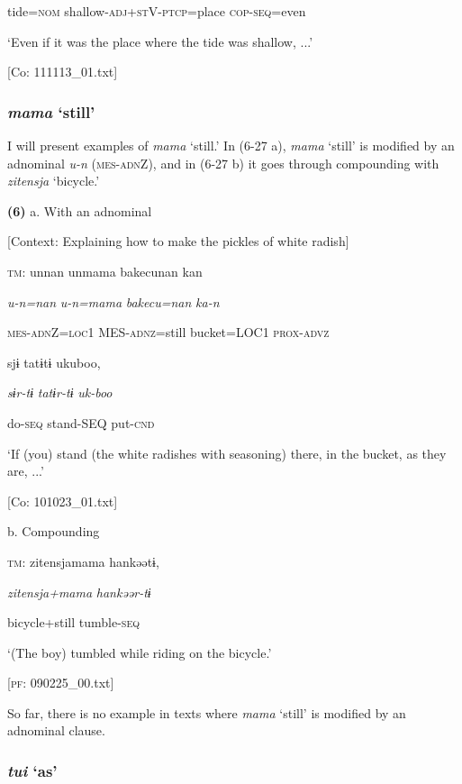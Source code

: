       tide=\textsc{nom}  shallow-\textsc{adj}+\textsc{st}V-\textsc{ptcp}=place  \textsc{cop}-\textsc{seq}=even

      ‘Even if it was the place where the tide was shallow, ...’

      [Co: 111113\_01.txt]

\subsubsection{ \textit{mama} ‘still’}

I will present examples of \textit{mama} ‘still.’ In (6-27 a), \textit{mama} ‘still’ is modified by an adnominal \textit{u-n} (\textsc{mes}-\textsc{adn}Z), and in (6-27 b) it goes through compounding with \textit{zitensja} ‘bicycle.’

\textbf{(6)}  a.  With an adnominal

    [Context: Explaining how to make the pickles of white radish]

    \textsc{tm}:  unnan  unmama  {\textbar}bakecu{\textbar}nan  kan

      \textit{u-n=nan}  \textit{u-n=mama}  \textit{bakecu=nan}  \textit{ka-n}

      \textsc{mes}-\textsc{adn}Z=\textsc{loc}1  MES-\textsc{adnz}=still  bucket=LOC1  \textsc{prox}-\textsc{advz}

      sjɨ  tatɨtɨ  ukuboo,

      \textit{sɨr-tɨ}  \textit{tatɨr-tɨ}  \textit{uk-boo}

      do-\textsc{seq}  stand-SEQ  put-\textsc{cnd}

      ‘If (you) stand (the white radishes with seasoning) there, in the bucket, as they are, ...’

      [Co: 101023\_01.txt]

  b.  Compounding

    \textsc{tm}:  {\textbar}zitensja{\textbar}mama  hankəətɨ,

      \textit{zitensja+mama}  \textit{hankəər-tɨ}

      bicycle+still  tumble-\textsc{seq}

      ‘(The boy) tumbled while riding on the bicycle.’

      [\textsc{pf}: 090225\_00.txt]

So far, there is no example in texts where \textit{mama} ‘still’ is modified by an adnominal clause.

\subsubsection{ \textit{tui} ‘as’}

